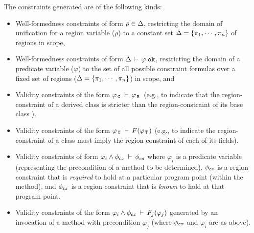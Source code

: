 The constraints generated are of the following kinds:
\begin{itemize}

\item Well-formedness constraints of form $\rho \in \Delta$,
restricting the domain of unification for a region variable ($\rho$)
to a constant set $\Delta = \{ \pi_1, \cdots, \pi_n \}$ of regions in scope,

\item Well-formedness constraints of form $\Delta\,\vdash\,\varphi \; \texttt{ok}$, restricting the domain of a predicate
variable ($\varphi$) to the set of all possible constraint formulas over a fixed set of 
regions ($\Delta = \{ \pi_1, \cdots, \pi_n \}$) in scope, and

\item Validity constraints of the form $\varphi_{\,{\tt C}\,}\,\vdash\,\varphi_{\,{\tt B}\,}$
  (e.g., to indicate that the region-constraint of a derived class  is stricter than
  the region-constraint of its base class ).

\item Validity constraints of the form $\varphi_{\,{\tt C}\,}\,\vdash\,{F(\varphi_{\,{\tt T}\,})}$
  (e.g., to indicate the region-constraint of a class  must imply the
  region-constraint of each of its fields).

\item Validity constraints of form $\varphi_i \wedge \phi_{cx}\,\vdash\,\phi_{cs}$
where $\varphi_i$ is a predicate variable (representing the precondition of a
method to be determined), $\phi_{cs}$ is a region constraint that is \emph{required}
to hold at a particular program point (within the method), and $\phi_{cx}$ is
a region constraint that is \emph{known} to hold at that program point.

%
%

\item Validity constraints of the form $\varphi_i \wedge \phi_{cx}\,\vdash\,F_j(\varphi_j)$
generated by an invocation of a method with precondition $\varphi_j$ (where $\phi_{cx}$ and
$\varphi_i$ are as above).

\end{itemize}

